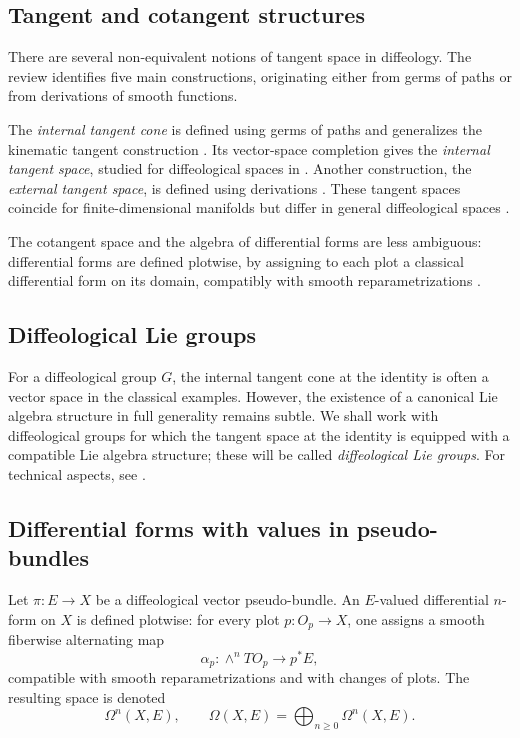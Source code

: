 \documentclass[11pt]{amsart}
\begin{document}
\subsection{Tangent and cotangent structures}

There are several non-equivalent notions of tangent space in diffeology. The review \cite{GMW2023} identifies five main constructions, originating either from germs of paths or from derivations of smooth functions.

The \emph{internal tangent cone} is defined using germs of paths and generalizes the kinematic tangent construction \cite{DN2007-1,KM}. Its vector-space completion gives the \emph{internal tangent space}, studied for diffeological spaces in \cite{He1995,ChristensenSinnamonWu2014}. Another construction, the \emph{external tangent space}, is defined using derivations \cite{Ma2013,GW2020}. These tangent spaces coincide for finite-dimensional manifolds but differ in general diffeological spaces \cite{ChristensenWu2016,GMW2023}.

The cotangent space and the algebra of differential forms are less ambiguous: differential forms are defined plotwise, by assigning to each plot a classical differential form on its domain, compatibly with smooth reparametrizations \cite{IglesiasZemmour2013,Ma2013}.

\subsection{Diffeological Lie groups}

For a diffeological group \(G\), the internal tangent cone at the identity is often a vector space in the classical examples. However, the existence of a canonical Lie algebra structure in full generality remains subtle. We shall work with diffeological groups for which the tangent space at the identity is equipped with a compatible Lie algebra structure; these will be called \emph{diffeological Lie groups}. For technical aspects, see \cite{Les}.

\subsection{Differential forms with values in pseudo-bundles}

Let \(\pi:E\to X\) be a diffeological vector pseudo-bundle. An \(E\)-valued differential \(n\)-form on \(X\) is defined plotwise: for every plot \(p:O_p\to X\), one assigns a smooth fiberwise alternating map
\[
\alpha_p:\wedge^n TO_p\to p^*E,
\]
compatible with smooth reparametrizations and with changes of plots. The resulting space is denoted
\[
\Omega^n(X,E),
\qquad
\Omega(X,E)=\bigoplus_{n\geq 0}\Omega^n(X,E).
\]
\end{document}
